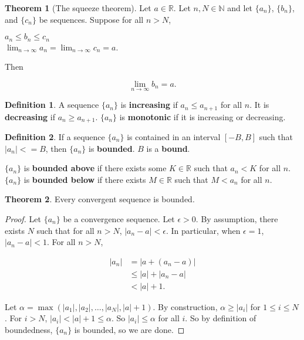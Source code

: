\documentclass{article}
\theoremstyle{definition}
\newtheorem{definition}{Definition}[section]
\newtheorem{theorem}{Theorem}[section]
\begin{document}
\begin{theorem}[The squeeze theorem] Let $a \in \mathbb{R}$. Let $n, N \in \mathbb{N}$ and let $\{a_n\}$, $\{b_n\}$, and $\{c_n\}$ be sequences. Suppose for all $n > N$,

\begin{center}
$a_n \leq b_n \leq c_n $\\
$\lim_{n \to \infty} a_n = \lim_{n \to \infty} c_n = a$.
\end{center}

Then

\begin{equation*}
\lim_{n \to \infty} b_n = a.
\end{equation*}

\end{theorem}

\begin{definition}
A sequence $\{a_n\}$ is \textbf{increasing} if $a_n \leq a_{n+1}$ for all $n$. It is \textbf{decreasing} if $a_n \geq a_{n+1}$. $\{a_n\}$ is \textbf{monotonic} if it is increasing or decreasing.
\end{definition}

\begin{definition}
If a sequence $\{a_n\}$ is contained in an interval $[-B, B]$ such that $|a_n| <= B$, then $\{a_n\}$ is \textbf{bounded}. $B$ is a \textbf{bound}.

$\{a_n\}$ is \textbf{bounded above} if there exists some $K \in \mathbb{R}$ such that $a_n < K$ for all $n$. $\{a_n\}$ is \textbf{bounded below} if there exists $M \in \mathbb{R}$ such that $M < a_n$ for all $n$.
\end{definition}

\begin{theorem} \label{convergent-bounded}
Every convergent sequence is bounded.
\end{theorem}

\begin{proof}
Let $\{a_n\}$ be a convergence sequence. Let $\epsilon > 0$. By assumption, there exists $N$ such that for all $n > N$, $|a_n - a| < \epsilon$. In particular, when $\epsilon = 1$, $|a_n - a| < 1$. For all $n > N$, 

\begin{align*}
|a_n| & = |a + (a_n - a)| \\
& \leq |a| + |a_n - a| \\
& < |a| + 1.
\end{align*}

Let $\alpha = \max(|a_1|, |a_2|, \ldots, |a_N|, |a| + 1)$. By construction, $\alpha \geq |a_i|$ for $1 \leq i \leq N$. For $i > N$, $|a_i| < |a| + 1 \leq \alpha$. So $|a_i| \leq \alpha$ for all $i$. So by definition of boundedness, $\{a_n\}$ is bounded, so we are done.
\end{proof}
\end{document}
